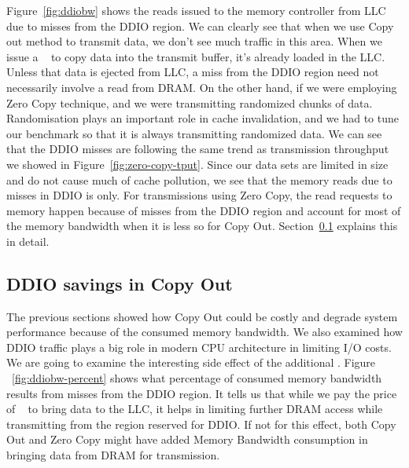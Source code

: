 Figure~\ref{fig:ddiobw} shows the reads issued to the memory controller from LLC due to misses from the  DDIO region. We can clearly see that when we use Copy out 
method to transmit data, we don't see much traffic in this area. When we issue a \memcpy~ to copy data into the transmit buffer, it's already loaded in the LLC. 
Unless that data is ejected from LLC, a miss from the DDIO region need not necessarily involve a read from DRAM. On the other hand, if we were employing Zero Copy technique, 
and we were transmitting randomized chunks of data. Randomisation plays an important role in cache invalidation,
 and we had to tune our benchmark so that it is always transmitting randomized data. 
We can see that the DDIO misses are following the same trend as transmission throughput we showed in Figure~\ref{fig:zero-copy-tput}. 
Since our data sets are limited in size and do not cause much of cache pollution, we see that the 
memory reads due to misses in DDIO is only. For transmissions using Zero Copy, 
the read requests to memory happen because of misses from the DDIO region and account for 
most of the memory bandwidth when it is less so for Copy Out. Section~\ref{sec:ddiobw-savings} explains this in detail.
\newline



\subsection{DDIO savings in Copy Out}
\label{sec:ddiobw-savings}
The previous sections showed how Copy Out could be costly and degrade system performance 
because of the consumed memory bandwidth. We also examined how DDIO traffic plays a big role 
in modern CPU architecture in limiting I/O costs. We are going to examine the 
interesting side effect of the additional \memcpy. Figure ~\ref{fig:ddiobw-percent} shows what percentage of consumed 
memory bandwidth results from misses from the DDIO region. It tells us that while 
we pay the price of \memcpy~ to bring data to the LLC, it helps in limiting further DRAM access while transmitting 
from the region reserved for DDIO. If not for this effect, both Copy Out and Zero Copy 
might have added Memory Bandwidth consumption in bringing data from DRAM for transmission. 



